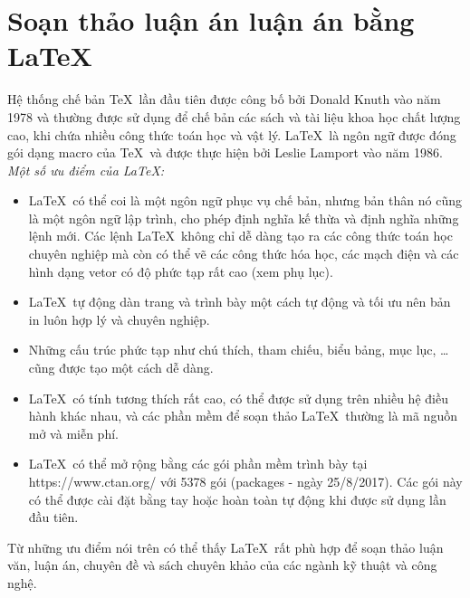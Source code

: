 \section{\bf Soạn thảo luận án luận án bằng \LaTeX}
Hệ thống chế bản \TeX\ lần đầu tiên được công bố bởi Donald Knuth vào năm 1978 và thường được sử dụng để chế bản các sách và tài liệu khoa học chất lượng cao, khi chứa nhiều công thức toán học và vật lý. \LaTeX\ là ngôn ngữ được đóng gói dạng macro của \TeX\ và được thực hiện bởi Leslie Lamport vào năm 1986. 
\textit{Một số ưu điểm của \LaTeX:}
\begin{itemize}
	\item \LaTeX\ có thể coi là một ngôn ngữ phục vụ chế bản, nhưng bản thân nó cũng là một ngôn ngữ lập trình, cho phép định nghĩa kế thừa và định nghĩa những lệnh mới. Các lệnh \LaTeX\ không chỉ dễ dàng tạo ra các công thức toán học chuyên nghiệp mà còn có thể vẽ các công thức hóa học, các mạch điện và các hình dạng vetor có độ phức tạp rất cao (xem phụ lục).
	\item \LaTeX\ tự động dàn trang và trình bày một cách tự động và tối ưu nên bản in luôn hợp lý và chuyên nghiệp.
	\item Những cấu trúc phức tạp như chú thích, tham chiếu, biểu bảng, mục
	lục, \ldots cũng được tạo một cách dễ dàng. 
	\item \LaTeX\ có tính tương thích rất cao, có thể được sử dụng trên nhiều hệ điều hành khác nhau, và các phần mềm để soạn thảo \LaTeX\ thường là mã nguồn mở và miễn phí.
	\item \LaTeX\ có thể mở rộng bằng các gói phần mềm trình bày tại https://www.ctan.org/ với 5378 gói (packages - ngày 25/8/2017). Các gói này có thể được cài đặt bằng tay hoặc hoàn toàn tự động khi được sử dụng lần đầu tiên.
\end{itemize}

Từ những ưu điểm nói trên có thể thấy \LaTeX\ rất phù hợp để soạn thảo luận văn, luận án, chuyên đề và sách chuyên khảo của các ngành kỹ thuật và công nghệ.


